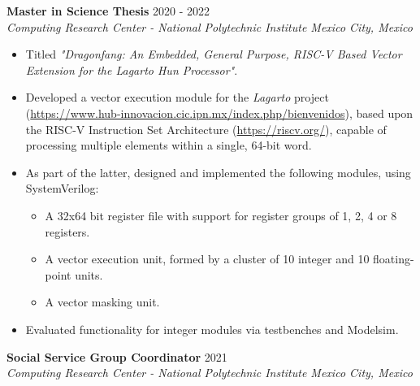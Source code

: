 \documentclass[10pt]{article}
\begin{document}
	\noindent
	\textbf{Master in Science Thesis}
			\hfill 2020 - 2022 \\
	\textit{Computing Research Center - 
			National Polytechnic Institute
			\hfill Mexico City, Mexico}
	
	\vspace{2em}

	\begin{minipage}{5.5in}
		\begin{itemize}
			\item Titled \emph{"Dragonfang: An Embedded, General Purpose, RISC-V
				Based Vector Extension for the Lagarto Hun Processor"}.

			\item Developed a vector execution module for the \emph{Lagarto}
				project
			(\url{https://www.hub-innovacion.cic.ipn.mx/index.php/bienvenidos}),
				based upon the RISC-V Instruction Set Architecture
				(\url{https://riscv.org/}), capable of processing multiple
				elements within a single, 64-bit word.

			\item As part of the latter, designed and implemented the following
				modules, using SystemVerilog:

				\begin{itemize}
					\item A 32x64 bit register file with support for
						register groups of 1, 2, 4 or 8 registers.

					\item A vector execution unit, formed by a cluster of 10
						integer and 10 floating-point units.

					\item A vector masking unit.
				\end{itemize}

			\item Evaluated functionality for integer modules via testbenches
				and Modelsim.
		\end{itemize}
	\end{minipage}

	\newpage

	\noindent
	\textbf{Social Service Group Coordinator}
			\hfill 2021 \\
	\textit{Computing Research Center - 
			National Polytechnic Institute
			\hfill Mexico City, Mexico}
	
	\vspace{2em}
\end{document}
